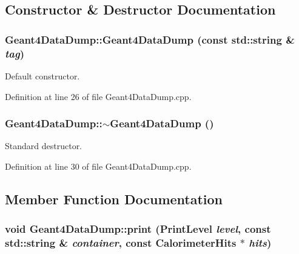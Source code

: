\subsection{Constructor \& Destructor Documentation}
\hypertarget{class_d_d4hep_1_1_simulation_1_1_geant4_data_dump_a2709938040240f38f527791859ebaf34}{
\subsubsection[{Geant4DataDump}]{\setlength{\rightskip}{0pt plus 5cm}Geant4DataDump::Geant4DataDump (const std::string \& {\em tag})}}
\label{class_d_d4hep_1_1_simulation_1_1_geant4_data_dump_a2709938040240f38f527791859ebaf34}


Default constructor. 

Definition at line 26 of file Geant4DataDump.cpp.\hypertarget{class_d_d4hep_1_1_simulation_1_1_geant4_data_dump_af966fda61c5237ac2858834cdeb1e238}{
\subsubsection[{$\sim$Geant4DataDump}]{\setlength{\rightskip}{0pt plus 5cm}Geant4DataDump::$\sim$Geant4DataDump ()}}
\label{class_d_d4hep_1_1_simulation_1_1_geant4_data_dump_af966fda61c5237ac2858834cdeb1e238}


Standard destructor. 

Definition at line 30 of file Geant4DataDump.cpp.

\subsection{Member Function Documentation}
\hypertarget{class_d_d4hep_1_1_simulation_1_1_geant4_data_dump_aedbce540469e2c554096f3b87fbd9991}{
\subsubsection[{print}]{\setlength{\rightskip}{0pt plus 5cm}void Geant4DataDump::print ({\bf PrintLevel} {\em level}, \/  const std::string \& {\em container}, \/  const {\bf CalorimeterHits} $\ast$ {\em hits})}}
\label{class_d_d4hep_1_1_simulation_1_1_geant4_data_dump_aedbce540469e2c554096f3b87fbd9991}


